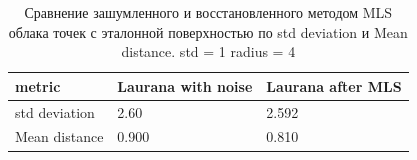 \begin{table}[h!]
\centering
\begin{tabular}{|p{3cm} |p{2cm}| p{3cm} |}
    \hline
    metric & Laurana with noise & Laurana after MLS \\
    \hline\hline
    std deviation & 2.60 &  2.592 \\
    \hline
    Mean distance &  0.900 &   0.810 \\
    \hline
\end{tabular}
\caption{Сравнение зашумленного и восстановленного методом MLS облака точек с эталонной поверхностью по std deviation и Mean distance. std = 1 radius = 4}
\label{table:1}
\end{table}